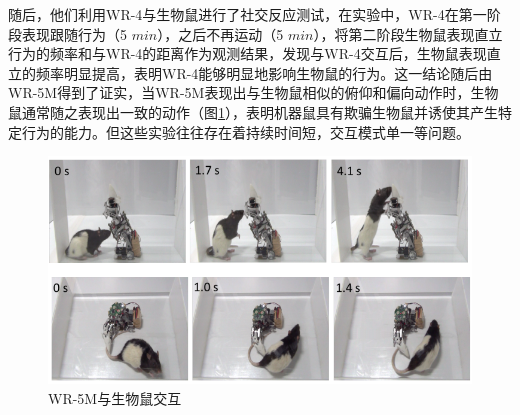 随后，他们利用WR-4与生物鼠进行了社交反应测试，在实验中，WR-4在第一阶段表现跟随行为（5 $min$），之后不再运动（5 $min$），将第二阶段生物鼠表现直立行为的频率和与WR-4的距离作为观测结果，发现与WR-4交互后，生物鼠表现直立的频率明显提高，表明WR-4能够明显地影响生物鼠的行为\cite{shiRobotratInteractionExperimental2011a}。这一结论随后由WR-5M得到了证实，当WR-5M表现出与生物鼠相似的俯仰和偏向动作时，生物鼠通常随之表现出一致的动作（图\ref{figure_wr5minter}），表明机器鼠具有欺骗生物鼠并诱使其产生特定行为的能力\cite{shiModifiedRoboticRat2018}。但这些实验往往存在着持续时间短，交互模式单一等问题。
\begin{figure}[htbp]
  \centering
  \includegraphics[width=0.6\linewidth]{images/ch01/wr-5minter}
  \caption{WR-5M与生物鼠交互\cite{shiModifiedRoboticRat2018}}\label{figure_wr5minter}
\end{figure}

